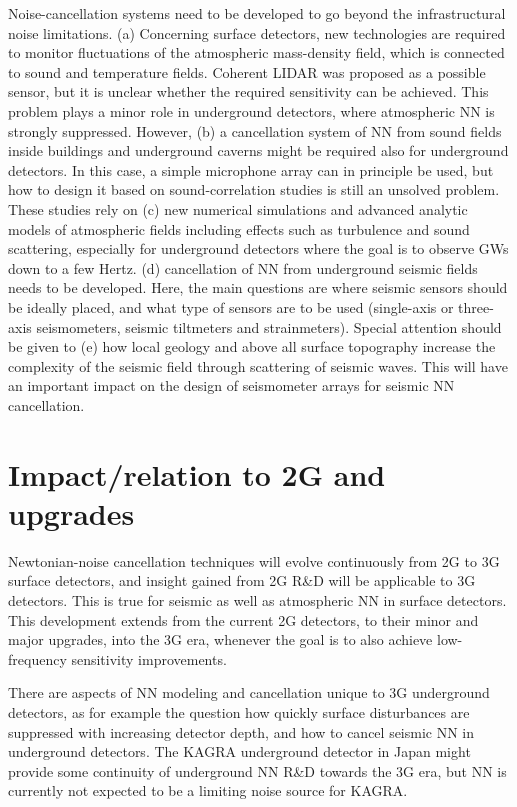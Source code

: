 Noise-cancellation systems need to be developed 
to go beyond the infrastructural noise limitations. (a) Concerning surface detectors, new technologies are required to monitor fluctuations of the atmospheric mass-density field, which is connected to sound and temperature fields. Coherent LIDAR was proposed as a possible sensor, but it is unclear whether the required sensitivity can be achieved. This problem plays a minor role in underground detectors, where atmospheric NN is strongly suppressed. However, (b) a cancellation system of NN from sound fields inside buildings and underground caverns might be required also for underground detectors. In this case, a simple microphone array can in principle be used, but how to design it based on sound-correlation studies is still an unsolved problem. These studies rely on (c) new numerical simulations and advanced analytic models of atmospheric fields including effects such as turbulence and sound scattering, especially for underground detectors where the goal is to observe GWs down to a few Hertz. (d) cancellation of NN from underground seismic fields needs to be developed. Here, the main questions are where seismic sensors should be ideally placed, and what type of sensors are to be used (single-axis or three-axis seismometers, seismic tiltmeters and strainmeters). Special attention should be given to (e) how local geology and above all surface topography increase the complexity of the seismic field through scattering of seismic waves. This will have an important impact on 
the design of seismometer arrays for seismic NN cancellation.

\section{Impact/relation to 2G and upgrades}
Newtonian-noise cancellation techniques will evolve continuously from 2G to 3G surface detectors, and insight gained from 2G R\&D will be applicable to 3G detectors. This is true for seismic as well as atmospheric NN in surface detectors. This development extends from the current 2G detectors, to their minor and major upgrades, into the 3G era, whenever the goal is to also achieve low-frequency sensitivity improvements. 

There are aspects of NN modeling and cancellation unique to 3G underground detectors, as for example the question how quickly surface disturbances are suppressed with increasing detector depth, and how to cancel seismic NN in underground detectors. The KAGRA underground detector in Japan might 
provide some continuity of underground NN R\&D towards the 3G era, but NN is currently not expected to be a limiting noise source for KAGRA.

